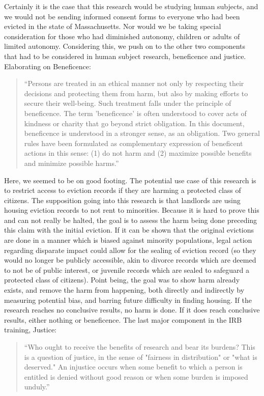 Certainly it is the case that this research would be studying human subjects, and we would not be sending informed consent forms to everyone who had been evicted in the state of Massachusetts.  Nor would we be taking special consideration for those who had diminished autonomy, children or adults of limited autonomy.  Considering this, we push on to the other two components that had to be considered in human subject research, beneficence and justice.
Elaborating on Beneficence:
\begin{quote}
“Persons are treated in an ethical manner not only by respecting their decisions and protecting them from harm, but also by making efforts to secure their well-being. Such treatment falls under the principle of beneficence. The term 'beneficence' is often understood to cover acts of kindness or charity that go beyond strict obligation. In this document, beneficence is understood in a stronger sense, as an obligation. Two general rules have been formulated as complementary expression of beneficent actions in this sense: (1) do not harm and (2) maximize possible benefits and minimize possible harms.” ~\citep{WEBSITE:10}
\end{quote}
\par
Here, we seemed to be on good footing.  The potential use case of this research is to restrict access to eviction records if they are harming a protected class of citizens.  The supposition going into this research is that landlords are using housing eviction records to not rent to minorities.  Because it is hard to prove this and can not really be halted, the goal is to assess the harm being done preceding this claim with the initial eviction.  If it can be shown that the original evictions are done in a manner which is biased against minority populations, legal action regarding disparate impact could allow for the sealing of eviction record (so they would no longer be publicly accessible, akin to divorce records which are deemed to not be of public interest, or juvenile records which are sealed to safeguard a protected class of citizens).  Point being, the goal was to show harm already exists, and remove the harm from happening, both directly and indirectly by measuring potential bias, and barring future difficulty in finding housing.  If the research reaches no conclusive results, no harm is done.  If it does reach conclusive results, either nothing or beneficence.
The last major component in the IRB training, Justice:
\begin{quote}
“Who ought to receive the benefits of research and bear its burdens? This is a question of justice, in the sense of "fairness in distribution" or "what is deserved." An injustice occurs when some benefit to which a person is entitled is denied without good reason or when some burden is imposed unduly.” ~\citep{WEBSITE:10}
\end{quote}

